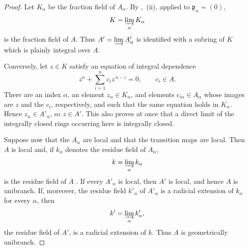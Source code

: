 \begin{proof}
Let $K_\alpha$ be the fraction field of $A_\alpha$.  By
,~(ii), applied to $\mathfrak p_\alpha=(0)$,
\[
  K=\varinjlim_\alpha K_\alpha
\]
is the fraction field of $A$.  Thus
$A'=\varinjlim A'_\alpha$ is identified with
a subring of $K$ which is plainly integral over $A$.

Conversely, let $z\in K$ satisfy an equation of integral
dependence
\[
  z^n+\sum_{i=1}^{n}c_i z^{\,n-i}=0,
  \qquad c_i\in A.
\]
There are an index $\alpha$, an element $z_\alpha\in K_\alpha$,
and elements $c_{i\alpha}\in A_\alpha$ whose images are
$z$ and the $c_i$, respectively, and such that the same equation
holds in $K_\alpha$.  Hence $z_\alpha\in A'_\alpha$, so
$z\in A'$.  This also proves at once that a direct limit of the
integrally closed rings occurring here is integrally closed.

Suppose now that the $A_\alpha$ are local and that the transition
maps are local.  Then $A$ is local and, if $k_\alpha$ denotes the
residue field of $A_\alpha$,
\[
  k=\varinjlim_\alpha k_\alpha
\]
is the residue field of $A$ .  If every
$A'_\alpha$ is local, then $A'$ is local, and hence $A$ is
unibranch.  If, moreover, the residue field $k'_\alpha$ of
$A'_\alpha$ is a radicial extension of $k_\alpha$ for every
$\alpha$, then
\[
  k'=\varinjlim_\alpha k'_\alpha,
\]
the residue field of $A'$, is a radicial extension of $k$.
Thus $A$ is geometrically unibranch.
\end{proof}
